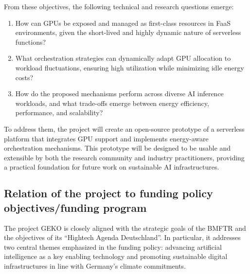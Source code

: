 From these objectives, the following technical and research questions emerge:
\begin{enumerate}
    \item How can GPUs be exposed and managed as first-class resources in FaaS environments, given the short-lived and highly dynamic nature of serverless functions? %
    \item What orchestration strategies can dynamically adapt GPU allocation to workload fluctuations, ensuring high utilization while minimizing idle energy costs? %
    \item How do the proposed mechanisms perform across diverse AI inference workloads, and what trade-offs emerge between energy efficiency, performance, and scalability? %
\end{enumerate}

To address them, the project will create an open-source prototype of a serverless platform that integrates GPU support and implements energy-aware orchestration mechanisms.
This prototype will be designed to be usable and extensible by both the research community and industry practitioners, providing a practical foundation for future work on sustainable AI infrastructures.


\subsection{Relation of the project to funding policy objectives/funding program}


The project GEKO is closely aligned with the strategic goals of the BMFTR and the objectives of its \enquote{Hightech Agenda Deutschland}.
In particular, it addresses two central themes emphasized in the funding policy: advancing artificial intelligence as a key enabling technology and promoting sustainable digital infrastructures in line with Germany's climate commitments.

